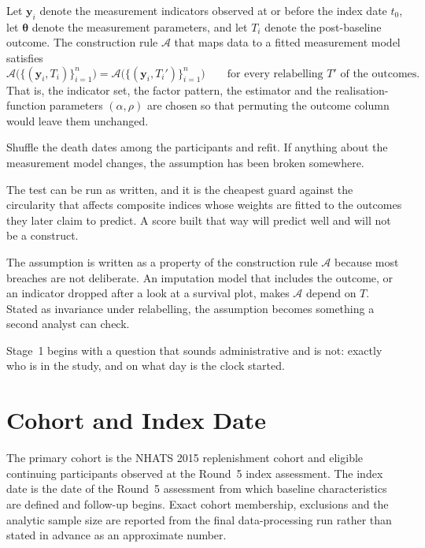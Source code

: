 \begin{assumption}
\label{ass:outcome_blind}
Let $\mathbf y_i$ denote the measurement indicators observed at or before the
index date $t_0$, let $\boldsymbol\theta$ denote the measurement parameters,
and let $T_i$ denote the post-baseline outcome. The construction rule
$\mathcal A$ that maps data to a fitted measurement model satisfies
\[
  \mathcal A\big(\{(\mathbf y_i,T_i)\}_{i=1}^{n}\big)
  =\mathcal A\big(\{(\mathbf y_i,T_i')\}_{i=1}^{n}\big)
  \qquad\text{for every relabelling } T'\text{ of the outcomes.}
\]
That is, the indicator set, the factor pattern, the estimator and the
realisation-function parameters $(\alpha,\rho)$ are chosen so that permuting
the outcome column would leave them unchanged.
\end{assumption}

\begin{reading}
Shuffle the death dates among the participants and refit. If anything about
the measurement model changes, the assumption has been broken somewhere.

The test can be run as written, and it is the cheapest guard
against the circularity that affects composite indices whose weights are
fitted to the outcomes they later claim to predict. A score built that way will
predict well and will not be a construct.
\end{reading}

The assumption is written as a property of the construction rule $\mathcal A$ because most breaches are not deliberate. An imputation model that includes the outcome, or an indicator dropped after a look at a survival plot, makes $\mathcal A$ depend on $T$. Stated as invariance under relabelling, the assumption becomes something a second analyst can check.

Stage~1 begins with a question that sounds administrative and is not: exactly who is in the study, and on what day is the clock started.

\section{Cohort and Index Date}
\label{sec:cohort}

The primary cohort is the NHATS 2015 replenishment cohort and eligible continuing participants observed at the Round~5 index assessment. The index date is the date of the Round~5 assessment from which baseline characteristics are defined and follow-up begins. Exact cohort membership, exclusions and the analytic sample size are reported from the final data-processing run rather than stated in advance as an approximate number.

